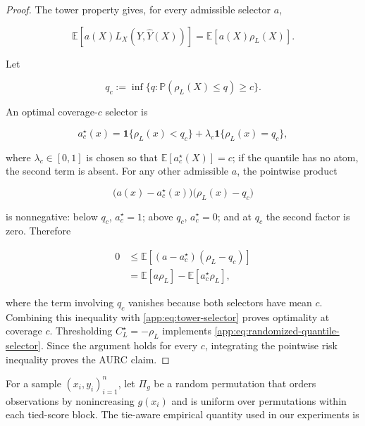 \begin{proof}
The tower property gives, for every admissible selector $a$,

\begin{equation}
  \mathbb{E}\!\left[a(X)L_X(Y,\widehat Y(X))\right]
  =\mathbb{E}\!\left[a(X)\rho_L(X)\right].
  \label{app:eq:tower-selector}
\end{equation}

Let

\begin{equation}
  q_c:=\inf\{q:\mathbb{P}(\rho_L(X)\leq q)\geq c\}.
\end{equation}

An optimal coverage-$c$ selector is

\begin{equation}
  a_c^\star(x)
  =\mathbf{1}\{\rho_L(x)<q_c\}
   +\lambda_c\mathbf{1}\{\rho_L(x)=q_c\},
  \label{app:eq:randomized-quantile-selector}
\end{equation}

where $\lambda_c\in[0,1]$ is chosen so that
$\mathbb{E}[a_c^\star(X)]=c$; if the quantile has no atom, the second
term is absent.  For any other admissible $a$, the pointwise product

\begin{equation}
  \big(a(x)-a_c^\star(x)\big)
  \big(\rho_L(x)-q_c\big)
\end{equation}

is nonnegative: below $q_c$, $a_c^\star=1$; above $q_c$,
$a_c^\star=0$; and at $q_c$ the second factor is zero.  Therefore

\begin{align}
  0
  &\leq
  \mathbb{E}\!\left[
    (a-a_c^\star)(\rho_L-q_c)\right] \\
  &=\mathbb{E}[a\rho_L]
    -\mathbb{E}[a_c^\star\rho_L],
\end{align}

where the term involving $q_c$ vanishes because both selectors have
mean $c$.  Combining this inequality with
\eqref{app:eq:tower-selector} proves optimality at coverage $c$.
Thresholding $C_L^\star=-\rho_L$ implements
\eqref{app:eq:randomized-quantile-selector}.  Since the argument holds
for every $c$, integrating the pointwise risk inequality proves the
AURC claim.
\end{proof}

For a sample $(x_i,y_i)_{i=1}^n$, let $\Pi_g$ be a random permutation
that orders observations by nonincreasing $g(x_i)$ and is uniform over
permutations within each tied-score block. The tie-aware empirical quantity
used in our experiments is

